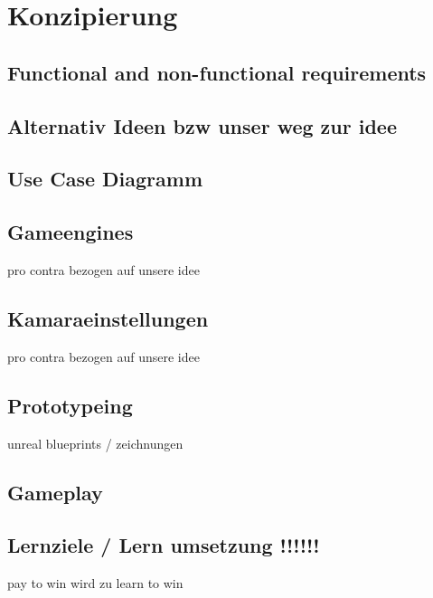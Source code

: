 \section{Konzipierung}
\subsection{Functional and non-functional requirements}
\subsection{Alternativ Ideen bzw unser weg zur idee}
\subsection{Use Case Diagramm}
\subsection{Gameengines}
	pro contra bezogen auf unsere idee
\subsection{Kamaraeinstellungen}
	pro contra bezogen auf unsere idee
\subsection{Prototypeing}
	unreal blueprints / zeichnungen
\subsection{Gameplay}
\subsection{Lernziele / Lern umsetzung !!!!!!}
	pay to win  wird zu  learn to win
